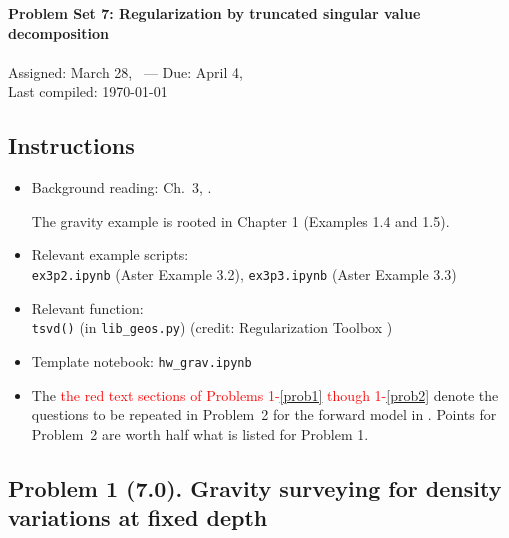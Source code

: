 \documentclass[11pt,titlepage,fleqn]{article}
\newcommand{\tfile}{{\tt hw\_grav.ipynb}}
\begin{document}

\begin{spacing}{1.2}
\centering
{\large \bf Problem Set 7: Regularization by truncated singular value decomposition} \\
\cltag\ \\
Assigned: March 28, \cyear\ --- Due: April 4, \cyear\ \\
Last compiled: \today
\end{spacing}


\subsection*{Instructions}

\begin{itemize}
\item Background reading: Ch.~3, \citet{Aster}.

The gravity example is rooted in Chapter 1 (Examples 1.4 and 1.5).

\item Relevant example scripts: \\ \verb+ex3p2.ipynb+ (Aster Example 3.2), \verb+ex3p3.ipynb+ (Aster Example 3.3)
\item Relevant function: \\ \verb+tsvd()+ (in \verb+lib_geos.py+) (credit: Regularization Toolbox \citep{Hansen})
\item Template notebook: \tfile\
\item The \textcolor{red}{the red text sections of Problems 1-\ref{prob1} though 1-\ref{prob2}} denote the questions to be repeated in Problem~2 for the forward model in . Points for Problem~2 are worth half what is listed for Problem 1.
\end{itemize}


\subsection*{Problem 1 (7.0). Gravity surveying for density variations at fixed depth}
\end{document}

